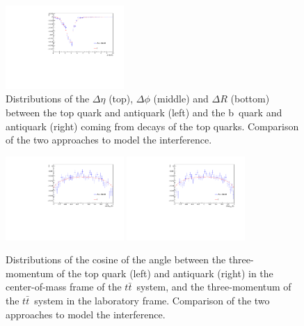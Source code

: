\begin{figure}
  \includegraphics[width=0.4\textwidth]{fig/chapt4/gen_plots/bbbar_deltaR_compare.pdf}
  \caption{Distributions of the $\Delta\eta$ (top), $\Delta\phi$ (middle) and $\Delta R$ (bottom) between the top quark and antiquark (left) and the b~quark and antiquark (right) coming from decays of the top quarks. Comparison of the two approaches to model the interference.}
  \label{fig:comparison_ttbar_bbbar}
\end{figure}

\begin{figure} \centering
  \includegraphics[width=0.4\textwidth]{fig/chapt4/gen_plots/top_theta_hel_compare.pdf}
  \includegraphics[width=0.4\textwidth]{fig/chapt4/gen_plots/tbar_theta_hel_compare.pdf}
  \caption{Distributions of the cosine of the angle between the three-momentum of the top quark (left) and antiquark (right) in the center-of-mass frame of the $t\bar t$~system, and the three-momentum of the $t\bar t$~system in the laboratory frame. Comparison of the two approaches to model the interference.}
  \label{fig:comparison_tophel}
\end{figure}


\clearpage{\pagestyle{empty}\cleardoublepage}
